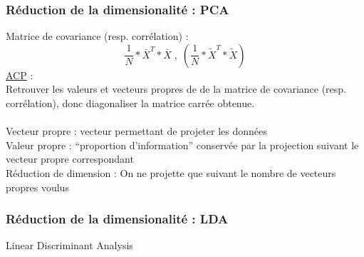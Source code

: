 \documentclass{formation}
\begin{document}
\begin{frame}
  \frametitle{Réduction de la dimensionalité : PCA}
  Matrice de covariance (resp. corrélation) :
  \[
  \frac{1}{N} * \bar{X}^T * \bar{X} \;,\;( \frac{1}{N} * \tilde{X}^T * \tilde{X} )
  \]
  \underline{ACP} : \\
  Retrouver les valeurs et vecteurs propres de de la matrice de covariance (resp. corrélation), donc diagonaliser la matrice carrée obtenue. \\
  \\
  Vecteur propre : vecteur permettant de projeter les données \\
  Valeur propre : ``proportion d'information'' conservée par la projection suivant le vecteur propre correspondant \\
  Réduction de dimension : On ne projette que suivant le nombre de vecteurs propres voulus
\end{frame}

\begin{frame}
  \frametitle{Réduction de la dimensionalité : LDA}
  \begin{center}
    Linear Discriminant Analysis
  \end{center}
  \begin{minipage}[l]{0.49\linewidth}
  \end{minipage}\hfill
  \begin{minipage}[l]{0.49\linewidth}
  \end{minipage}\hfill
\end{frame}
\end{document}
